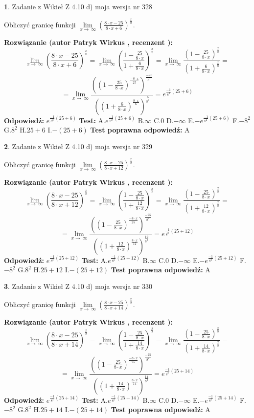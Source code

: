 \documentclass[12pt, a4paper]{article}
\theoremstyle{definition} %
\newtheorem{zad}{}
\newcommand{\zadStart}[1]{\begin{zad}#1\newline}
\newcommand{\zadStop}{\end{zad}}
\newcommand{\rozwStart}[2]{\noindent \textbf{Rozwiązanie (autor #1 , recenzent #2): }\newline}
\newcommand{\rozwStop}{\newline}
\newcommand{\odpStart}{\noindent \textbf{Odpowiedź:}\newline}
\newcommand{\odpStop}{\newline}
\newcommand{\testStart}{\noindent \textbf{Test:}\newline}
\newcommand{\testStop}{\newline}
\newcommand{\kluczStart}{\noindent \textbf{Test poprawna odpowiedź:}\newline}
\newcommand{\kluczStop}{\newline}
\begin{document}
\zadStart{Zadanie z Wikieł Z 4.10 d) moja wersja nr 328}


Obliczyć granicę funkcji  $\lim\limits_{x\to\ \infty}(\frac{8\cdot x-25}{8\cdot x+6})^{\frac{x}{8}}$.
\zadStop
\rozwStart{Patryk Wirkus}{}
$$\lim\limits_{x\to\ \infty}(\frac{8\cdot x-25}{8\cdot x+6})^{\frac{x}{8}} = \lim\limits_{x\to\ \infty}(\frac{1-\frac{25}{8\cdot x}}{1+\frac{6}{8\cdot x}})^{\frac{x}{8}}=\lim\limits_{x\to\ \infty}\frac{(1-\frac{25}{8\cdot x})^{\frac{x}{8}}}{(1+\frac{6}{8\cdot x})^{\frac{x}{8}}}=$$
$$=\lim\limits_{x\to\ \infty}\frac{((1-\frac{25}{8\cdot x})^{\frac{-8\cdot x}{25}})^{\frac{-25}{8^{2}}}}{((1+\frac{6}{8\cdot x})^{\frac{8\cdot x}{6}})^{\frac{6}{8^{2}}}}=e^{\frac{-1}{8^{2}}(25+6)}$$
\rozwStop
\odpStart
$e^{\frac{-1}{8^{2}}(25+6)}$
\odpStop
\testStart
A.$e^{\frac{-1}{8^{2}}(25+6)}$ B.$\infty$ C.$0$ D.$-\infty$ E.$-e^{\frac{-1}{8^{2}}(25+6)}$
F.$-8^{2}$ G.$8^{2}$
H.$25+6$
I.$-(25+6)$
\testStop
\kluczStart
A
\kluczStop



\zadStart{Zadanie z Wikieł Z 4.10 d) moja wersja nr 329}


Obliczyć granicę funkcji  $\lim\limits_{x\to\ \infty}(\frac{8\cdot x-25}{8\cdot x+12})^{\frac{x}{8}}$.
\zadStop
\rozwStart{Patryk Wirkus}{}
$$\lim\limits_{x\to\ \infty}(\frac{8\cdot x-25}{8\cdot x+12})^{\frac{x}{8}} = \lim\limits_{x\to\ \infty}(\frac{1-\frac{25}{8\cdot x}}{1+\frac{12}{8\cdot x}})^{\frac{x}{8}}=\lim\limits_{x\to\ \infty}\frac{(1-\frac{25}{8\cdot x})^{\frac{x}{8}}}{(1+\frac{12}{8\cdot x})^{\frac{x}{8}}}=$$
$$=\lim\limits_{x\to\ \infty}\frac{((1-\frac{25}{8\cdot x})^{\frac{-8\cdot x}{25}})^{\frac{-25}{8^{2}}}}{((1+\frac{12}{8\cdot x})^{\frac{8\cdot x}{12}})^{\frac{12}{8^{2}}}}=e^{\frac{-1}{8^{2}}(25+12)}$$
\rozwStop
\odpStart
$e^{\frac{-1}{8^{2}}(25+12)}$
\odpStop
\testStart
A.$e^{\frac{-1}{8^{2}}(25+12)}$ B.$\infty$ C.$0$ D.$-\infty$ E.$-e^{\frac{-1}{8^{2}}(25+12)}$
F.$-8^{2}$ G.$8^{2}$
H.$25+12$
I.$-(25+12)$
\testStop
\kluczStart
A
\kluczStop



\zadStart{Zadanie z Wikieł Z 4.10 d) moja wersja nr 330}


Obliczyć granicę funkcji  $\lim\limits_{x\to\ \infty}(\frac{8\cdot x-25}{8\cdot x+14})^{\frac{x}{8}}$.
\zadStop
\rozwStart{Patryk Wirkus}{}
$$\lim\limits_{x\to\ \infty}(\frac{8\cdot x-25}{8\cdot x+14})^{\frac{x}{8}} = \lim\limits_{x\to\ \infty}(\frac{1-\frac{25}{8\cdot x}}{1+\frac{14}{8\cdot x}})^{\frac{x}{8}}=\lim\limits_{x\to\ \infty}\frac{(1-\frac{25}{8\cdot x})^{\frac{x}{8}}}{(1+\frac{14}{8\cdot x})^{\frac{x}{8}}}=$$
$$=\lim\limits_{x\to\ \infty}\frac{((1-\frac{25}{8\cdot x})^{\frac{-8\cdot x}{25}})^{\frac{-25}{8^{2}}}}{((1+\frac{14}{8\cdot x})^{\frac{8\cdot x}{14}})^{\frac{14}{8^{2}}}}=e^{\frac{-1}{8^{2}}(25+14)}$$
\rozwStop
\odpStart
$e^{\frac{-1}{8^{2}}(25+14)}$
\odpStop
\testStart
A.$e^{\frac{-1}{8^{2}}(25+14)}$ B.$\infty$ C.$0$ D.$-\infty$ E.$-e^{\frac{-1}{8^{2}}(25+14)}$
F.$-8^{2}$ G.$8^{2}$
H.$25+14$
I.$-(25+14)$
\testStop
\kluczStart
A
\kluczStop
\end{document}
